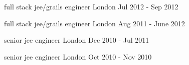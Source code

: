 \begin{cventries}
    \cventry
    {full stack jee/grails engineer}
    {}
    {London}
    {Jul 2012 - Sep 2012}
    {}
    {}

    \cventry
    {full stack jee/grails engineer}
    {}
    {London}
    {Aug 2011 - June 2012}
    {}
    {}

    \cventry
    {senior jee engineer}
    {}
    {London}
    {Dec 2010 - Jul 2011}
    {}
    {}

    \cventry
    {senior jee engineer}
    {}
    {London}
    {Oct 2010 - Nov 2010}
    {}
    {}
\end{cventries}
